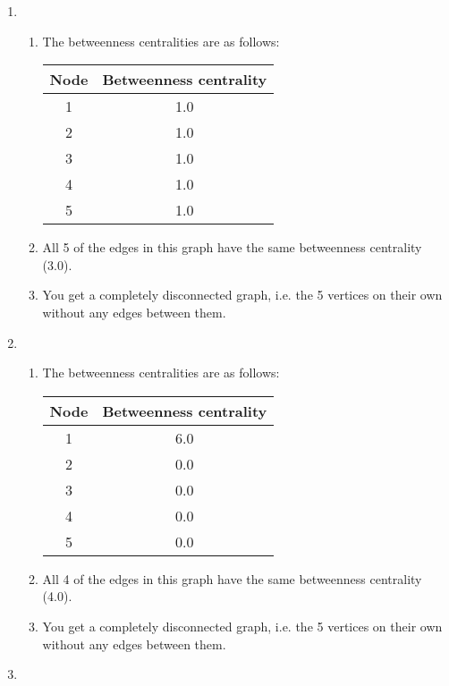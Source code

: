\documentclass[12pt]{article}
\begin{document}
\begin{enumerate}
    \item \begin{enumerate}
        \item The betweenness centralities are as follows:\\
            \begin{tabular}{|c|c|}
                \hline
                \textbf{Node} & \textbf{Betweenness centrality}\\
                \hline
                1 & 1.0 \\
                2 & 1.0 \\
                3 & 1.0 \\
                4 & 1.0 \\
                5 & 1.0 \\
                \hline
            \end{tabular}
        \item All 5 of the edges in this graph have the same betweenness centrality (3.0).
        \item You get a completely disconnected graph, i.e. the 5 vertices on their own without any edges between them.
    \end{enumerate}
    \item \begin{enumerate}
        \item The betweenness centralities are as follows:\\
            \begin{tabular}{|c|c|}
                \hline
                \textbf{Node} & \textbf{Betweenness centrality}\\
                \hline
                1 & 6.0 \\
                2 & 0.0 \\
                3 & 0.0 \\
                4 & 0.0 \\
                5 & 0.0 \\
                \hline
            \end{tabular}
        \item All 4 of the edges in this graph have the same betweenness centrality (4.0).
        \item You get a completely disconnected graph, i.e. the 5 vertices on their own without any edges between them.
    \end{enumerate}
    \item \begin{enumerate}

\end{enumerate}
\end{enumerate}
\end{document}

